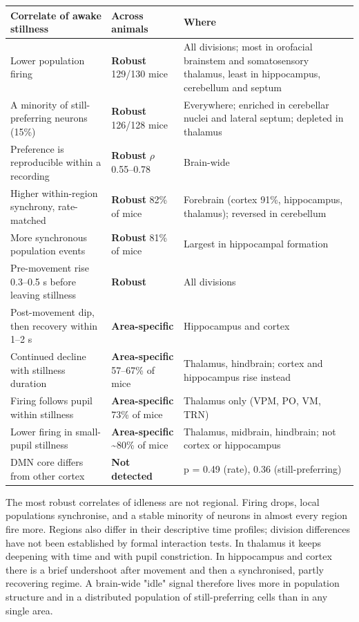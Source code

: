 \documentclass[10pt,a4paper]{article}
\begin{document}
{\small\renewcommand{\arraystretch}{1.2}
\begin{xltabular}{\linewidth}{>{\hsize\raggedright\arraybackslash}X>{\hsize\raggedright\arraybackslash}X>{\hsize\raggedright\arraybackslash}X}
\toprule
\textbf{Correlate of awake stillness} & \textbf{Across animals} & \textbf{Where} \\
\midrule
\endhead
Lower population firing & \textcolor{okc}{\textbf{Robust}} 129/130 mice & All divisions; most in orofacial brainstem and somatosensory thalamus, least in hippocampus, cerebellum and septum \\
A minority of still-preferring neurons (15\%) & \textcolor{okc}{\textbf{Robust}} 126/128 mice & Everywhere; enriched in cerebellar nuclei and lateral septum; depleted in thalamus \\
Preference is reproducible within a recording & \textcolor{okc}{\textbf{Robust}} $\rho$ 0.55--0.78 & Brain-wide \\
Higher within-region synchrony, rate-matched & \textcolor{okc}{\textbf{Robust}} 82\% of mice & Forebrain (cortex 91\%, hippocampus, thalamus); reversed in cerebellum \\
More synchronous population events & \textcolor{okc}{\textbf{Robust}} 81\% of mice & Largest in hippocampal formation \\
Pre-movement rise 0.3--0.5 s before leaving stillness & \textcolor{okc}{\textbf{Robust}} & All divisions \\
Post-movement dip, then recovery within 1--2 s & \textcolor{partc}{\textbf{Area-specific}} & Hippocampus and cortex \\
Continued decline with stillness duration & \textcolor{partc}{\textbf{Area-specific}} 57--67\% of mice & Thalamus, hindbrain; cortex and hippocampus rise instead \\
Firing follows pupil within stillness & \textcolor{partc}{\textbf{Area-specific}} 73\% of mice & Thalamus only (VPM, PO, VM, TRN) \\
Lower firing in small-pupil stillness & \textcolor{partc}{\textbf{Area-specific}} \textasciitilde{}80\% of mice & Thalamus, midbrain, hindbrain; not cortex or hippocampus \\
DMN core differs from other cortex & \textcolor{partc}{\textbf{Not detected}} & p = 0.49 (rate), 0.36 (still-preferring) \\
\bottomrule
\end{xltabular}}

The most robust correlates of idleness are not regional. Firing drops, local populations synchronise, and a stable minority of neurons in almost every region fire more. Regions also differ in their descriptive time profiles; division differences have not been established by formal interaction tests. In thalamus it keeps deepening with time and with pupil constriction. In hippocampus and cortex there is a brief undershoot after movement and then a synchronised, partly recovering regime. A brain-wide "idle" signal therefore lives more in population structure and in a distributed population of still-preferring cells than in any single area.
\end{document}
